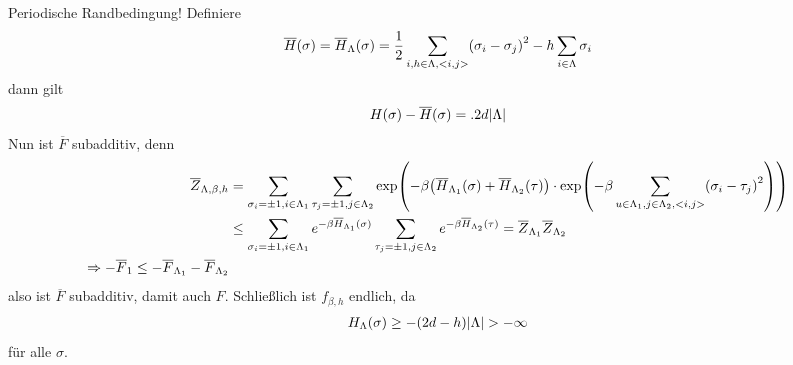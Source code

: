  \begin{beweis}
 	Periodische Randbedingung! Definiere
 	\begin{align}
 		\overline{H} (\sigma) = \overline{H}_{\Lambda}(\sigma) = \frac{1}{2} \sum\limits_{i,h \in \Lambda, <i,j>} \enb{\sigma_i - \sigma_j}^2 - h \sum\limits_{i \in \Lambda} \sigma_i
 	\end{align}
 	dann gilt 
 	\begin{align}
 		H(\sigma) - \overline{H}(\sigma) = .2d\lvert\Lambda\rvert
 	\end{align}
 	Nun ist $\overline{F}$ subadditiv, denn
 	\begin{align}
 		\overline{Z}_{\Lambda, \beta, h} &= \sum\limits_{\sigma_i = \pm 1, i \in \Lambda_1} \sum\limits_{\tau_j = \pm1, j \in \Lambda_2} \exp\enb{-\beta \enb{\overline{H}_{\Lambda_1}(\sigma) + \overline{H}_{\Lambda_2}(\tau)} \cdot \exp\enb{- \beta \sum\limits_{u \in \Lambda_1, j \in \Lambda_2, <i,j>} \enb{\sigma_i - \tau_j}^2 }  } \\
 		&\leq \sum\limits_{\sigma_i = \pm1, i \in \Lambda_1} e^{-\beta \overline{H}_{\Lambda_1} (\sigma)} \sum\limits_{\tau_j = \pm1, j \in \Lambda_2} e^{- \beta \overline{H}_{\Lambda_2}(\tau)} = \overline{Z}_{\Lambda_1} \overline{Z}_{\Lambda_2} \\
 		\Rightarrow - \overline{F}_1 \leq -\overline{F}_{\Lambda_1} - \overline{F}_{\Lambda_2}
 	\end{align}
 	also ist $\overline{F}$ subadditiv, damit auch $F$. Schließlich ist $f_{\beta, h}$ endlich, da 
 	\begin{align}
 		H_{\Lambda}(\sigma) \geq - \enb{2d - h} \abs{\Lambda} > - \infty
 	\end{align} für alle $\sigma$.
 \end{beweis}
 
